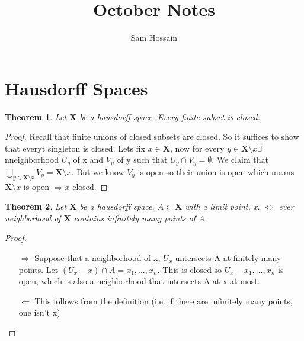 \documentclass[a4paper, 12pt]{article}
\newcommand{\XX}{\mathbf{X}}
\newtheorem{theorm}{Theorem}
\begin{document}
\title{October Notes}
\author{Sam Hossain}

\maketitle
\section{Hausdorff Spaces}
\begin{theorm}
Let $\XX$ be a hausdorff space. Every finite subset is closed.
\end{theorm}
\begin{proof}
Recall that finite unions of closed subsets are closed. So it suffices to show that everyt singleton is closed. Lets fix $x \in \XX$, now for every $y \in \XX \setminus {x} \exists$ nneighborhood $U_y$ of x and $V_y$ of y such that $U_y \cap V_y = \emptyset$. We claim that $\bigcup\limits_{y \in \XX \setminus {x}} V_y = \XX \setminus {x}$. But we know $V_y$ is open so their union is open which means $\XX \setminus {x}$ is open $\Rightarrow {x}$ closed.
\end{proof}

\begin{theorm}
Let $\XX$ be a hausdorff space. $A \subset \XX$ with a limit point, x. $\Leftrightarrow$ ever neighborhood of $\XX$ contains infinitely many points of A.
\end{theorm}
\begin{proof}~
        \begin{enumerate}
                \item[$\Rightarrow$] Suppose that a neighborhood of x, $U_x$ untersects A at finitely many points. Let $(U_x - {x}) \cap A = {x_1, \dots, x_n}$. This is closed so $U_x - {x_1, \dots, x_n}$ is open, which is also a neighborhood that intersects A at {x} at most.
                \item[$\Leftarrow$] This follows from the definition (i.e. if there are infinitely many points, one isn't x)
        \end{enumerate}
\end{proof}
\end{document}
